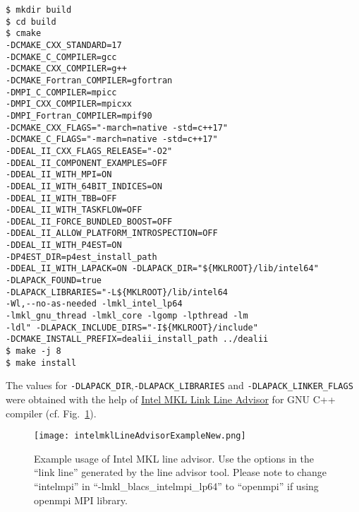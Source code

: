 \begin{verbatim}
$ mkdir build
$ cd build
$ cmake
-DCMAKE_CXX_STANDARD=17
-DCMAKE_C_COMPILER=gcc 
-DCMAKE_CXX_COMPILER=g++
-DCMAKE_Fortran_COMPILER=gfortran
-DMPI_C_COMPILER=mpicc 
-DMPI_CXX_COMPILER=mpicxx 
-DMPI_Fortran_COMPILER=mpif90
-DCMAKE_CXX_FLAGS="-march=native -std=c++17"
-DCMAKE_C_FLAGS="-march=native -std=c++17"
-DDEAL_II_CXX_FLAGS_RELEASE="-O2"
-DDEAL_II_COMPONENT_EXAMPLES=OFF
-DDEAL_II_WITH_MPI=ON
-DDEAL_II_WITH_64BIT_INDICES=ON
-DDEAL_II_WITH_TBB=OFF
-DDEAL_II_WITH_TASKFLOW=OFF 
-DDEAL_II_FORCE_BUNDLED_BOOST=OFF
-DDEAL_II_ALLOW_PLATFORM_INTROSPECTION=OFF
-DDEAL_II_WITH_P4EST=ON 
-DP4EST_DIR=p4est_install_path 
-DDEAL_II_WITH_LAPACK=ON -DLAPACK_DIR="${MKLROOT}/lib/intel64"
-DLAPACK_FOUND=true
-DLAPACK_LIBRARIES="-L${MKLROOT}/lib/intel64
-Wl,--no-as-needed -lmkl_intel_lp64
-lmkl_gnu_thread -lmkl_core -lgomp -lpthread -lm
-ldl" -DLAPACK_INCLUDE_DIRS="-I${MKLROOT}/include" 
-DCMAKE_INSTALL_PREFIX=dealii_install_path ../dealii
$ make -j 8
$ make install
\end{verbatim}
The values for \verb|-DLAPACK_DIR|,\verb|-DLAPACK_LIBRARIES| and \verb|-DLAPACK_LINKER_FLAGS| were obtained with the help of \href{https://software.intel.com/en-us/articles/intel-mkl-link-line-advisor}{Intel MKL Link Line Advisor} for GNU C++ compiler (cf. Fig.~\ref{fig:intelmkl}).\\ 
\begin{figure}[htp]
    \centering
\texttt{[image: intelmklLineAdvisorExampleNew.png]}
    \caption{Example usage of Intel MKL line advisor. Use the options in the ``link line'' generated by the line advisor tool. Please note to change ``intelmpi'' in ``-lmkl\_blacs\_intelmpi\_lp64'' to ``openmpi'' if using openmpi MPI library.}
    \label{fig:intelmkl}
\end{figure}




